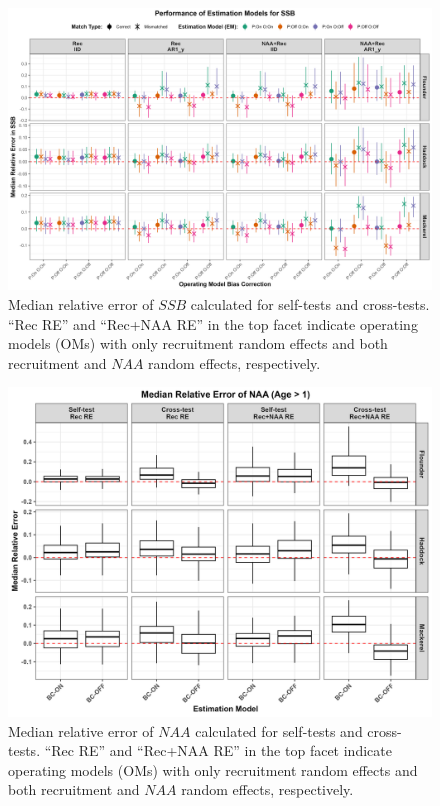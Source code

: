 \documentclass[
  12pt,
]{article}
\begin{document}
\begin{figure}[H]
\centering
\includegraphics[width=\textwidth]{Revised_Figures&Tables/OM_EM_Comparison_Plot_SSB.PNG}
\caption{Median relative error of $SSB$ calculated for self-tests and cross-tests. ``Rec RE'' and ``Rec+NAA RE'' in the top facet indicate operating models (OMs) with only recruitment random effects and both recruitment and $NAA$ random effects, respectively.}
\label{fig:supp_OM_EM_Comparison_Plot_SSB}
\end{figure}

\begin{figure}[H]
    \centering
    \includegraphics[width=\textwidth]{Revised_Figures&Tables/Median_NAA.PNG}
    \caption{Median relative error of $NAA$ calculated for self-tests and cross-tests. ``Rec RE'' and ``Rec+NAA RE'' in the top facet indicate operating models (OMs) with only recruitment random effects and both recruitment and $NAA$ random effects, respectively.}
    \label{fig:supp_Median_NAA}
\end{figure}
\end{document}
